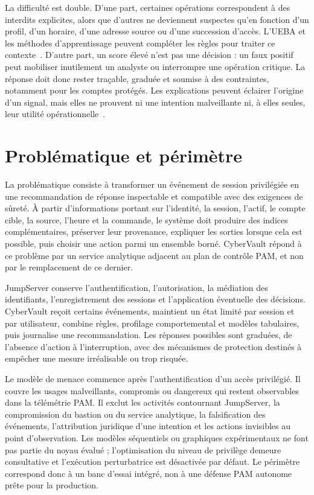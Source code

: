 \documentclass[11pt,a4paper,oneside]{report}
\theoremstyle{definition}
\theoremstyle{plain}
\begin{document}
La difficulté est double. D'une part, certaines opérations correspondent à
des interdits explicites, alors que d'autres ne deviennent suspectes qu'en
fonction d'un profil, d'un horaire, d'une adresse source ou d'une succession
d'accès. L'UEBA et les méthodes d'apprentissage peuvent compléter les règles
pour traiter ce contexte~\cite{ref7,ref24,ref27}. D'autre part, un score élevé
n'est pas une décision : un faux positif peut mobiliser inutilement un
analyste ou interrompre une opération critique. La réponse doit donc rester
traçable, graduée et soumise à des contraintes, notamment pour les comptes
protégés. Les explications peuvent éclairer l'origine d'un signal, mais elles
ne prouvent ni une intention malveillante ni, à elles seules, leur utilité
opérationnelle~\cite{ref12,ref13,ref25}.

\section{Problématique et périmètre}
\label{sec:intro-problem}

La problématique consiste à transformer un événement de session privilégiée
en une recommandation de réponse inspectable et compatible avec des exigences
de sûreté. À partir d'informations portant sur l'identité, la session,
l'actif, le compte cible, la source, l'heure et la commande, le système doit
produire des indices complémentaires, préserver leur provenance, expliquer
les sorties lorsque cela est possible, puis choisir une action parmi un
ensemble borné. CyberVault répond à ce problème par un service analytique
adjacent au plan de contrôle PAM, et non par le remplacement de ce dernier.

JumpServer conserve l'authentification, l'autorisation, la médiation des
identifiants, l'enregistrement des sessions et l'application éventuelle des
décisions. CyberVault reçoit certains événements, maintient un état limité par
session et par utilisateur, combine règles, profilage comportemental et
modèles tabulaires, puis journalise une recommandation. Les réponses possibles
sont graduées, de l'absence d'action à l'interruption, avec des mécanismes de
protection destinés à empêcher une mesure irréalisable ou trop risquée.

Le modèle de menace commence après l'authentification d'un accès privilégié.
Il couvre les usages malveillants, compromis ou dangereux qui restent
observables dans la télémétrie PAM. Il exclut les activités contournant
JumpServer, la compromission du bastion ou du service analytique, la
falsification des événements, l'attribution juridique d'une intention et les
actions invisibles au point d'observation. Les modèles séquentiels ou
graphiques expérimentaux ne font pas partie du noyau évalué ; l'optimisation
du niveau de privilège demeure consultative et l'exécution perturbatrice est
désactivée par défaut. Le périmètre correspond donc à un banc d'essai
intégré, non à une défense PAM autonome prête pour la production.
\end{document}
